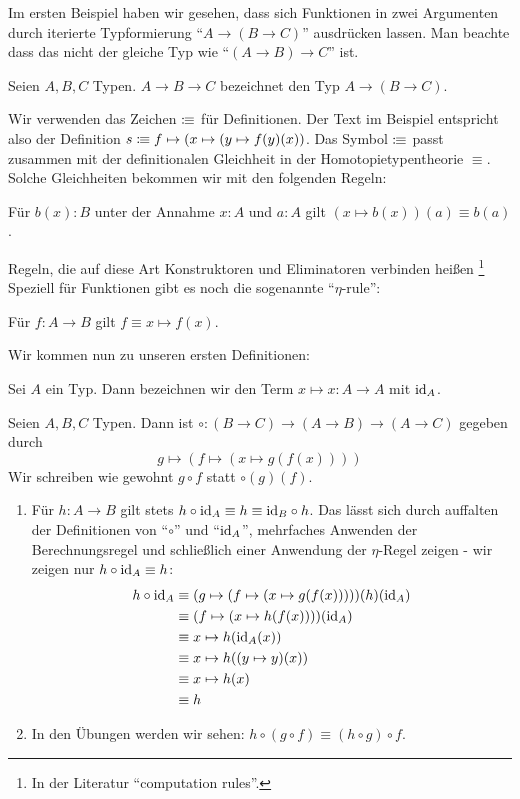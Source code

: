 Im ersten Beispiel haben wir gesehen, dass sich Funktionen in zwei Argumenten durch iterierte Typformierung ``$A\to (B\to C)$'' ausdrücken lassen. Man beachte dass das nicht der gleiche Typ wie ``$(A\to B)\to C$'' ist.
\begin{konvention}
  Seien $A,B,C$ Typen. $A\to B\to C$ bezeichnet den Typ $A\to (B\to C)$.
\end{konvention}
Wir verwenden das Zeichen $\vcentcolon\mspace{-1.2mu}\equiv$ für Definitionen.
Der Text im Beispiel entspricht also der Definition $s\vcentcolon\mspace{-1.2mu}\equiv f\mapsto (x\mapsto (y \mapsto f(y)(x))$.
Das Symbol $\vcentcolon\mspace{-1.2mu}\equiv$ passt zusammen mit der definitionalen Gleichheit in der Homotopietypentheorie $\equiv$. Solche Gleichheiten bekommen wir mit den folgenden Regeln:
\begin{center}
  Für $b(x):B$ unter der Annahme $x:A$ und $a:A$ gilt $(x\mapsto b(x))(a)\equiv b(a)$.
\end{center}
Regeln, die auf diese Art Konstruktoren und Eliminatoren verbinden heißen \footnote{In der Literatur ``computation rules''.}
Speziell für Funktionen gibt es noch die sogenannte ``$\eta$-rule'':
\begin{center}
  Für $f:A\to B$ gilt $f\equiv x\mapsto f(x)$.
\end{center}

Wir kommen nun zu unseren ersten Definitionen:
\begin{definition}
  Sei $A$ ein Typ. Dann bezeichnen wir den Term $x\mapsto x:A\to A$ mit $\mathrm{id}_A$.
\end{definition}

\begin{definition}
  Seien $A,B,C$ Typen. Dann ist $\circ:(B\to C)\to (A\to B) \to (A\to C)$ gegeben durch
  \[
    g\mapsto (f\mapsto (x\mapsto g(f(x))))
  \]
  Wir schreiben wie gewohnt $g\circ f$ statt $\circ(g)(f)$.
\end{definition}

\begin{bemerkung}
\begin{enumerate}
\item Für $h:A\to B$ gilt stets $h\circ \mathrm{id}_A\equiv h\equiv \mathrm{id}_B\circ h$.
  Das lässt sich durch auffalten der Definitionen von ``$\circ$'' und ``$\mathrm{id}_A$'', mehrfaches Anwenden der Berechnungsregel und schließlich einer Anwendung der $\eta$-Regel zeigen - wir zeigen nur $h\circ \mathrm{id}_A\equiv h$:
  \begin{align*}
    h\circ \mathrm{id}_A &\equiv (g\mapsto (f\mapsto (x\mapsto g(f(x)))))(h)(\mathrm{id}_A) \\
    &\equiv (f\mapsto (x\mapsto h(f(x))))(\mathrm{id}_A) \\
    &\equiv x\mapsto h(\mathrm{id}_A(x)) \\
    &\equiv x\mapsto h((y\mapsto y)(x)) \\
    &\equiv x\mapsto h(x) \\
    &\equiv h
  \end{align*}
\item In den Übungen werden wir sehen: $h \circ (g\circ f)\equiv (h\circ g)\circ f$.
\end{enumerate}
\end{bemerkung}

